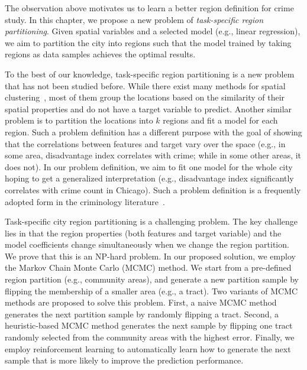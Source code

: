 The observation above motivates us to learn a better region definition for crime study. In this chapter, we propose a new problem of \emph{task-specific region partitioning}. Given spatial variables and a selected model  (e.g., linear regression), we aim to partition the city into regions such that the model trained by taking regions as data samples achieves the optimal results.

To the best of our knowledge, task-specific region partitioning is a new problem that has not been studied before. While there exist many methods for spatial clustering~\cite{miller2009geographic}, most of them group the locations based on the similarity of their spatial properties and do not have a target variable to predict. Another similar problem is to partition the locations into $k$ regions and fit a model for each region. Such a problem definition has a different purpose with the goal of showing that the correlations between features and target vary over the space (e.g., in some area, disadvantage index  correlates with crime; while in some other areas, it does not). In our problem definition, we aim to fit one model for the whole city hoping to get a generalized interpretation (e.g., disadvantage index significantly correlates with crime count in Chicago). Such a problem definition is a frequently adopted form in the criminology literature~\cite{graif2014urban}.

Task-specific city region partitioning is a challenging problem. The key challenge lies in that the region properties (both features and target variable) and the model coefficients change simultaneously when we change the region partition. We prove that this is an NP-hard problem. In our proposed solution, we employ the Markov Chain Monte Carlo (MCMC) method. We start from a pre-defined region partition (e.g., community areas), and generate a new partition sample by flipping the membership of a smaller area (e.g., a tract). Two variants of MCMC methods are proposed to solve this problem. First, a naive MCMC method generates the next partition sample by randomly flipping a tract. Second, a heuristic-based MCMC method generates the next sample by flipping one tract randomly selected from the community areas with the highest error. Finally, we employ reinforcement learning to automatically learn how to generate the next sample that is more likely to improve the prediction performance.


